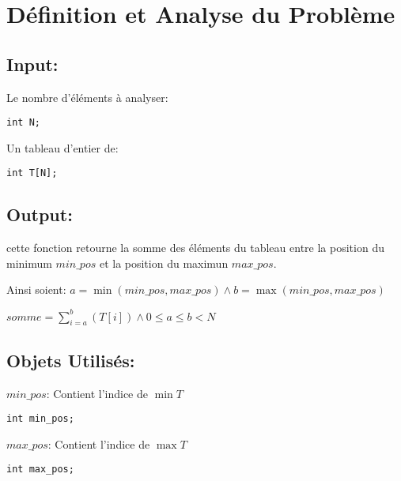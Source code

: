 %

\section{Définition et Analyse du Problème}\label{analyse}

\subsection{Input:}

\begingroup
Le nombre d'éléments à analyser:
\endgroup
\begin{lstlisting}
int N;
\end{lstlisting}

\vspace{0.3cm}

\begingroup
Un tableau d'entier de:
\endgroup
\begin{lstlisting}
int T[N];
\end{lstlisting}

\subsection{Output:}
\quad 
cette fonction retourne la somme des éléments du tableau entre la position du minimum \emph{$min\_pos$} et la position 
du maximun \emph{$max\_pos$}.
\par
Ainsi soient:
$a=\min(min\_pos, max\_pos) \land b=\max(min\_pos, max\_pos)$
\par
$somme=\sum_{i=a}^{b}(T[i]) \land 0 \le a \le b < N$

\subsection{Objets Utilisés:}

\begingroup
$min\_pos$: Contient l'indice de $\min{T}$
\endgroup
\begin{lstlisting}
int min_pos;
\end{lstlisting}

\begingroup
$max\_pos$: Contient l'indice de $\max{T}$
\endgroup
\begin{lstlisting}
int max_pos;
\end{lstlisting}


